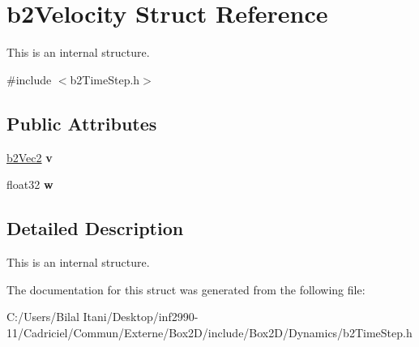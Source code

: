 \hypertarget{structb2_velocity}{}\section{b2\+Velocity Struct Reference}
\label{structb2_velocity}


This is an internal structure.  




{\ttfamily \#include $<$b2\+Time\+Step.\+h$>$}

\subsection*{Public Attributes}
\begin{DoxyCompactItemize}
\item 
\hyperlink{structb2_vec2}{b2\+Vec2} {\bfseries v}\hypertarget{structb2_velocity_a73b92ceff532491e71b9dbc53eecaa70}{}\label{structb2_velocity_a73b92ceff532491e71b9dbc53eecaa70}

\item 
float32 {\bfseries w}\hypertarget{structb2_velocity_a6ce6f6c83ceb95100532d3f2b0485b83}{}\label{structb2_velocity_a6ce6f6c83ceb95100532d3f2b0485b83}

\end{DoxyCompactItemize}


\subsection{Detailed Description}
This is an internal structure. 

The documentation for this struct was generated from the following file\+:\begin{DoxyCompactItemize}
\item 
C\+:/\+Users/\+Bilal Itani/\+Desktop/inf2990-\/11/\+Cadriciel/\+Commun/\+Externe/\+Box2\+D/include/\+Box2\+D/\+Dynamics/b2\+Time\+Step.\+h\end{DoxyCompactItemize}
